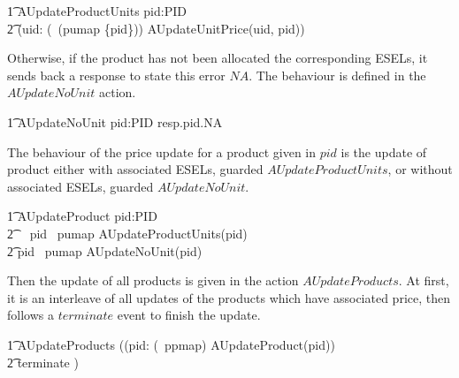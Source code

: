 \begin{circusaction}
        \t1 AUpdateProductUnits \circdef pid:PID \circspot \\
            \t2 (\Interleave uid: (\dom~(pumap \rres \{pid\})) \linter \emptyset \rinter \circspot AUpdateUnitPrice(uid, pid)) \\
\end{circusaction}
Otherwise, if the product has not been allocated the corresponding ESELs, it sends back a response to state this error $NA$. The behaviour is defined in the $AUpdateNoUnit$ action. 
\begin{circusaction}
        \t1 AUpdateNoUnit \circdef  pid:PID \circspot resp.pid.NA \then \Skip \\ 
\end{circusaction}

The behaviour of the price update for a product given in $pid$ is the update of product either with associated ESELs, guarded $AUpdateProductUnits$, or without associated ESELs, guarded $AUpdateNoUnit$.  
\begin{circusaction}
        \t1 AUpdateProduct \circdef pid:PID \circspot \\
            \t2 \,\,\,\, \lcircguard pid \in \ran~pumap \rcircguard \circguard AUpdateProductUnits(pid) \\
            \t2 \extchoice \lcircguard pid \notin \ran~pumap \rcircguard \circguard AUpdateNoUnit(pid) \\
\end{circusaction}

Then the update of all products is given in the action $AUpdateProducts$. At first, it is an interleave of all updates of the products which have associated price, then follows a $terminate$ event to finish the update.
\begin{circusaction}
        \t1 AUpdateProducts \circdef ((\Interleave pid: (\dom~ppmap) \linter \emptyset \rinter \circspot AUpdateProduct(pid)) \\
        \t2 \circseq terminate \then \Skip) \\
\end{circusaction}


